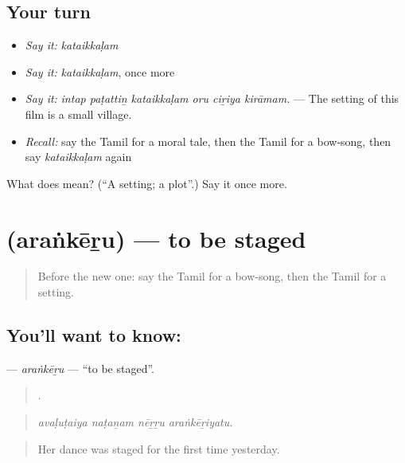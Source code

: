 \subsection*{Your turn}
\begin{itemize}
\raggedright
  \item \emph{Say it:} \emph{kataikkaḷam}
  \item \emph{Say it:} \emph{kataikkaḷam}, once more
  \item \emph{Say it:} \emph{intap paṭattiṉ kataikkaḷam oru ciṟiya kirāmam.} — The setting of this film is a small village.
  \item \emph{Recall:} say the Tamil for a moral tale, then the Tamil for a bow-song, then say \emph{kataikkaḷam} again
\end{itemize}

\begin{tcolorbox}[breakable,colback=teal!4,colframe=teal!35!black,title={Before you move on}]
What does  mean? (\textquotedblleft{}A setting; a plot\textquotedblright{}.) Say it once more.
\end{tcolorbox}
\section[\texorpdfstring{\ta{அரங்கேறு} (araṅkēṟu)}{அரங்கேறு (araṅkēṟu)}]{ (araṅkēṟu) — to be staged}

\label{lesson:TA-C345-arankeru}



\begin{quote}
Before the new one: say the Tamil for a bow-song, then the Tamil for a setting.
\end{quote}

\subsection*{You'll want to know: }
\textbf{} — \emph{araṅkēṟu} — \textquotedblleft{}to be staged\textquotedblright{}.

\begin{quote}
   .
\end{quote}

\begin{quote}
\emph{avaḷuṭaiya naṭaṉam nēṟṟu araṅkēṟiyatu.}
\end{quote}

\begin{quote}
Her dance was staged for the first time yesterday.
\end{quote}

